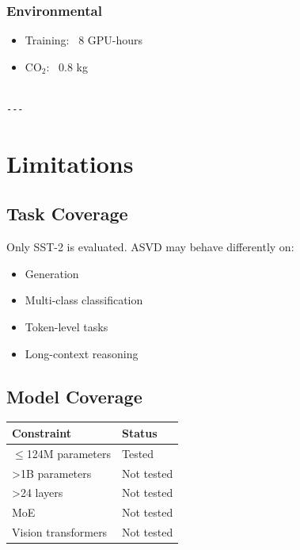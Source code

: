 \subsubsection{Environmental}
\begin{itemize}
\item Training: ~8 GPU-hours
\item CO$_2$: ~0.8 kg
\end{itemize}
\begin{lstlisting}

---
\end{lstlisting}


\section{Limitations}

\subsection{Task Coverage}

Only SST-2 is evaluated. ASVD may behave differently on:
\begin{itemize}
\item Generation
\item Multi-class classification
\item Token-level tasks
\item Long-context reasoning

\end{itemize}
\subsection{Model Coverage}

\begin{table}[H]
\centering
\small
\begin{tabular}{ll}
\toprule
\textbf{Constraint} & \textbf{Status} \\
\midrule
$\le$124M parameters & Tested \\
\textgreater{}1B parameters & Not tested \\
\textgreater{}24 layers & Not tested \\
MoE & Not tested \\
Vision transformers & Not tested \\
\bottomrule
\end{tabular}
\end{table}

